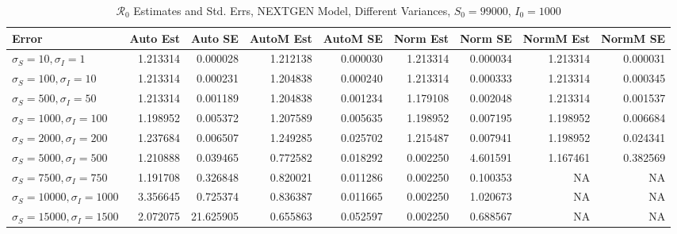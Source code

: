 \documentclass[12pt]{article}
\newcommand{\rr}{\ensuremath{\mathcal{R}_0}}
\begin{document}
\begin{table}[H]
	
	\caption{$\rr$ Estimates and Std. Errs, NEXTGEN Model, 
		Different Variances, $S_0 = 99000$, $I_0 = 1000$}
	\begin{footnotesize}
		\hskip -1.7cm
	\begin{tabular}{l|r|r|r|r|r|r|r|r}
		\hline
		Error & Auto Est & Auto SE & AutoM Est & AutoM SE & Norm Est & Norm SE & NormM Est & NormM SE\\
		\hline
		$\sigma_S = 10, \sigma_I = 1$ & 1.213314 & 0.000028 & 1.212138 & 0.000030 & 1.213314 & 0.000034 & 1.213314 & 0.000031\\
		\hline
		$\sigma_S = 100, \sigma_I = 10$ & 1.213314 & 0.000231 & 1.204838 & 0.000240 & 1.213314 & 0.000333 & 1.213314 & 0.000345\\
		\hline
		$\sigma_S = 500, \sigma_I = 50$ & 1.213314 & 0.001189 & 1.204838 & 0.001234 & 1.179108 & 0.002048 & 1.213314 & 0.001537\\
		\hline
		$\sigma_S = 1000, \sigma_I = 100$ & 1.198952 & 0.005372 & 1.207589 & 0.005635 & 1.198952 & 0.007195 & 1.198952 & 0.006684\\
		\hline
		$\sigma_S = 2000, \sigma_I = 200$ & 1.237684 & 0.006507 & 1.249285 & 0.025702 & 1.215487 & 0.007941 & 1.198952 & 0.024341\\
		\hline
		$\sigma_S = 5000, \sigma_I = 500$ & 1.210888 & 0.039465 & 0.772582 & 0.018292 & 0.002250 & 4.601591 & 1.167461 & 0.382569\\
		\hline
		$\sigma_S = 7500, \sigma_I = 750$ & 1.191708 & 0.326848 & 0.820021 & 0.011286 & 0.002250 & 0.100353 & NA & NA\\
		\hline
		$\sigma_S = 10000, \sigma_I = 1000$ & 3.356645 & 0.725374 & 0.836387 & 0.011665 & 0.002250 & 1.020673 & NA & NA\\
		\hline
		$\sigma_S = 15000, \sigma_I = 1500$ & 2.072075 & 21.625905 & 0.655863 & 0.052597 & 0.002250 & 0.688567 & NA & NA\\
		\hline
	\end{tabular}
\end{footnotesize}
\end{table}
\end{document}
